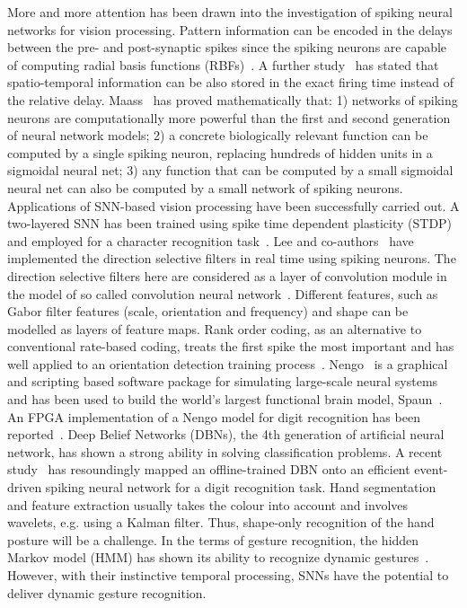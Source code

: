 More and more attention has been drawn into the investigation of spiking neural networks for vision processing. 
Pattern information can be encoded in the delays between the pre- and post-synaptic spikes since the spiking neurons are capable of computing radial basis functions (RBFs)~\cite{hopfield1995pattern}.  
A further study~\cite{natschlager1998spatial} has stated that spatio-temporal information can be also stored in the exact firing time instead of the relative delay. Maass~\cite{maass1997networks} has proved mathematically that:
1) networks of spiking neurons are computationally more powerful than the first and second generation of neural network models;
2) a concrete biologically relevant function can be computed by a single spiking neuron, replacing  hundreds of hidden units in a sigmoidal neural net;
3) any function that can be computed by a small sigmoidal neural net can also be computed by a small network of spiking neurons.
Applications of SNN-based vision processing have been successfully carried out. 
A two-layered SNN has been trained using spike time dependent plasticity (STDP) and employed for a character recognition task~\cite{gupta2007character}. 
Lee and co-authors~\cite{6467270} have implemented the direction selective filters in real time using spiking neurons. 
The direction selective filters here are considered as a layer of convolution module in the model of so called convolution neural network~\cite{camunas2012event}. 
Different features, such as Gabor filter features (scale, orientation and frequency) and shape can be modelled as layers of feature maps. 
Rank order coding, as an alternative to conventional rate-based coding, treats the first spike the most important and has well applied to an orientation detection training process~\cite{delorme2001networks}. 
Nengo~\cite{eliasmith2011nengo} is a graphical and scripting based software package for simulating large-scale neural systems and has been used to build the world's largest functional brain model, Spaun~\cite{eliasmith2012large}. An FPGA implementation of a Nengo model for digit recognition has been reported~\cite{naylor2013managing}. 
Deep Belief Networks (DBNs), the 4th generation of artificial neural network, has shown a strong ability in solving classification problems. 
A recent study~\cite{o2013real} has resoundingly mapped an offline-trained DBN onto an efficient event-driven spiking neural network for a digit recognition task.
Hand segmentation and feature extraction usually takes the colour into account and involves wavelets, e.g. using a Kalman filter. 
Thus, shape-only recognition of the hand posture will be a challenge. 
In the terms of gesture recognition, the hidden Markov model (HMM) has shown its ability to recognize dynamic gestures~\cite{elmezain2009hidden}. 
However, with their instinctive temporal processing, SNNs have the potential to deliver dynamic gesture recognition.



